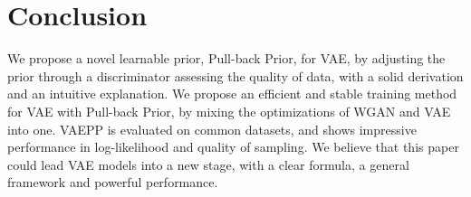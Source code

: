 \section{Conclusion}

We propose a novel learnable prior, Pull-back Prior, for VAE, by adjusting the prior through a discriminator assessing the quality of data, with a solid derivation and an intuitive explanation. We propose an efficient and stable training method for VAE with Pull-back Prior, by mixing the optimizations of WGAN and VAE into one. VAEPP is evaluated on common datasets, and shows impressive performance in log-likelihood and quality of sampling. We believe that this paper could lead VAE models into a new stage, with a clear formula, a general framework and powerful performance. 
